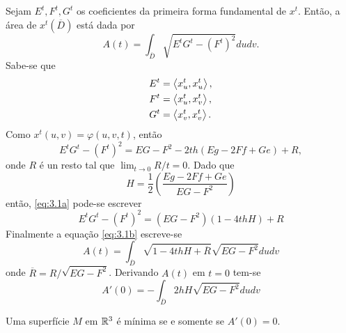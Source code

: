 Sejam $E^t, F^t, G^t$ os coeficientes da primeira forma fundamental de $x^t$.
Então, a área de $x^t(\overline{D})$ está dada por
\begin{equation*}\label{eq:3.1b}
	A(t) = \int_{\overline{D}} \sqrt{E^t G^t - (F^t)^2} du dv.
\end{equation*}
Sabe-se que
\begin{align*}
	E^t &= \left\langle x_u^t,x_u^t \right\rangle,\\
	F^t &= \left\langle x_u^t,x_v^t \right\rangle,\\
	G^t &= \left\langle x_v^t,x_v^t \right\rangle.
\end{align*}
Como $x^t(u,v) = \varphi(u,v,t)$, então
\begin{equation*}\label{eq:3.1a}
	E^t G^t - (F^t)^2 = E G - F^2 - 2 t h (Eg - 2Ff + Ge) + R,
\end{equation*}
onde $R$ é un resto tal que $\lim_{t \rightarrow 0} R/t = 0$.
Dado que
\begin{equation*}
	H = \frac{1}{2} \left(\frac{Eg - 2Ff + Ge}{E G - F^2}\right)
\end{equation*}
então, \eqref{eq:3.1a} pode-se escrever
\begin{equation*}
	E^t G^t - (F^t)^2 = (EG - F^2)(1 - 4thH) + R
\end{equation*}
Finalmente a equação \eqref{eq:3.1b} escreve-se
\begin{equation*}
	A(t) = \int_{\overline{D}} \sqrt{1 - 4thH + \overline{R}} \sqrt{EG - F^2} du dv
\end{equation*}
onde $\overline{R} = R/\sqrt{EG - F^2}$.
Derivando $A(t)$ em $t=0$ tem-se
\begin{equation*}\label{eq:3.1c}
	A'(0) = -\int_{\overline{D}} 2hH \sqrt{EG - F^2} du dv
\end{equation*}

\begin{proposicao}\label{caracteristica_das_superficies_minimas}
	Uma superfície $M$ em $\mathbb{R}^3$ é mínima se e somente se $A'(0) = 0$.
\end{proposicao}

